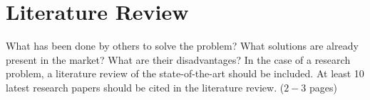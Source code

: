 
\chapter{Literature Review}
\label{Chapter3}

What has been done by others to solve the problem? What solutions are already present in the market? What are their disadvantages? In the case of a research problem, a literature review of the state-of-the-art should be included. At least 10 latest research papers should be cited in the literature review. ($2-3$ pages)